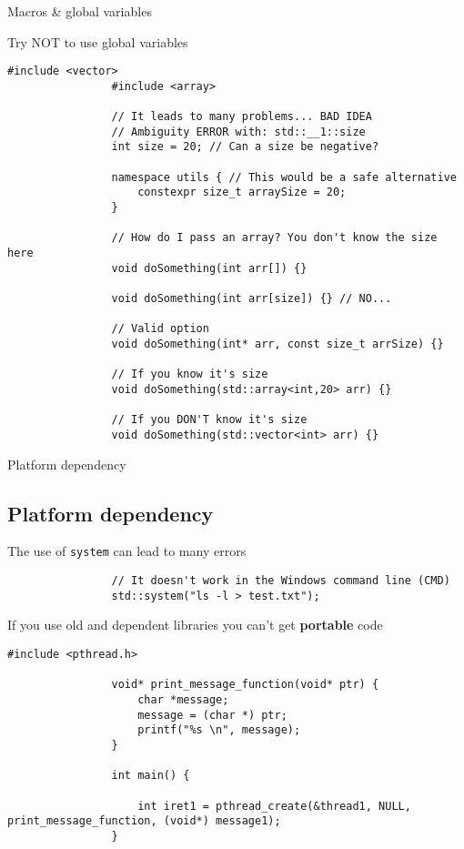 \documentclass{beamer}
\newcommand{\normalSizeItem}[1] {
  \normalsize{\item #1}
}
\newcommand{\smallCite}[1]{
	\begin{small}
		\cite{#1}	
	\end{small}
}
\begin{document}
		\begin{frame}[fragile]{Macros \& global variables}	
			\begin{itemize}
			
				\normalSizeItem{Try NOT to use global variables}
				\begin{lstlisting}[basicstyle={\tiny\ttfamily}]
				#include <vector>
				#include <array>
				
				// It leads to many problems... BAD IDEA
				// Ambiguity ERROR with: std::__1::size
				int size = 20; // Can a size be negative?
				
				namespace utils { // This would be a safe alternative
					constexpr size_t arraySize = 20;
				}
				
				// How do I pass an array? You don't know the size here
				void doSomething(int arr[]) {}
				
				void doSomething(int arr[size]) {} // NO...
				
				// Valid option
				void doSomething(int* arr, const size_t arrSize) {}
				
				// If you know it's size
				void doSomething(std::array<int,20> arr) {}
				
				// If you DON'T know it's size
				void doSomething(std::vector<int> arr) {}
				\end{lstlisting}
				
			\end{itemize}
		\end{frame}
		
		\begin{frame}[fragile]{Platform dependency}	
			\subsection{Platform dependency}		
			\begin{itemize}

				\normalSizeItem { The use of \texttt{system} can lead to many errors}
				\begin{lstlisting}
				// It doesn't work in the Windows command line (CMD)
				std::system("ls -l > test.txt");
				\end{lstlisting}
				
				\normalSizeItem { If you use old and dependent libraries you can't get \textbf{portable} code \smallCite{posixThreads}}
				\begin{lstlisting}[basicstyle={\tiny\ttfamily}]
				#include <pthread.h>

				void* print_message_function(void* ptr) {
					char *message;
					message = (char *) ptr;
					printf("%s \n", message);
				}
				
				int main() {
			
					int iret1 = pthread_create(&thread1, NULL, print_message_function, (void*) message1);
				}

				\end{lstlisting}
				
			\end{itemize}
		\end{frame}
		
\end{document}
